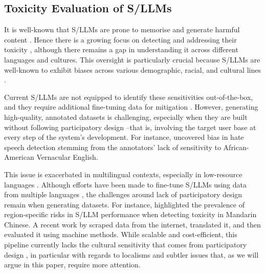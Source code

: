 \subsection{Toxicity Evaluation of S/LLMs}
It is well-known that S/LLMs are prone to memorise and generate harmful content \cite{sheng-etal-2019-woman,wang2023decodingtrust,rauh2022characteristics,gehman-etal-2020-realtoxicityprompts}. 
Hence there is a growing focus on detecting and addressing their toxicity \cite{rauh2022characteristics,gehman-etal-2020-realtoxicityprompts}, although there remains a gap in understanding it across different languages and cultures. 
This oversight is particularly crucial because S/LLMs are well-known to exhibit biases across various demographic, racial, and cultural lines \cite{dhmala2021}.

Current S/LLMs are not equipped to identify these sensitivities out-of-the-box, and they require additional fine-tuning data for mitigation \cite{hebrewoffensive}. 
However, generating high-quality, annotated datasets is challenging, especially when they are built without following participatory design \cite{davidson2019}--that is, involving the target user base at every step of the system's development. 
For instance, \citet{sap-etal-2019-risk} uncovered bias in hate speech detection stemming from the annotators' lack of sensitivity to African-American Vernacular English.

This issue is exacerbated in multilingual contexts, especially in low-resource languages \cite{deng2024multilingual, lai2023chatgpt}. 
Although efforts have been made to fine-tune S/LLMs using data from multiple languages \cite{wang2023languages, wang2024chinese, hebrewoffensive}, the challenges around lack of participatory design remain when generating datasets. 
For instance, \citet{wang2024chinese} highlighted the prevalence of region-specific risks in S/LLM performance when detecting toxicity in Mandarin Chinese. 
A recent work by \citet{jain2024polyglotoxicitypromptsmultilingualevaluationneural} scraped data from the internet, translated it, and then evaluated it using machine methods. While scalable and cost-efficient, this pipeline currently lacks the cultural sensitivity that comes from participatory design \cite{li2024how}, in particular with regards to localisms and subtler issues that, as we will argue in this paper, require more attention. 


